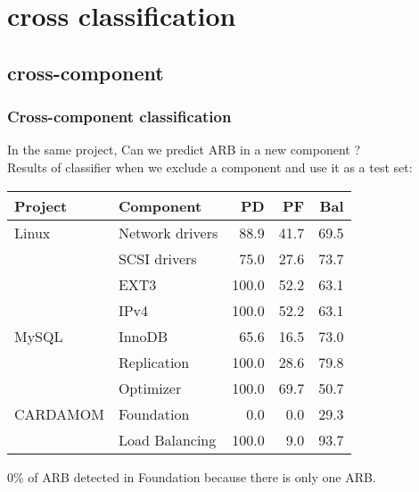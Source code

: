 \section{cross classification}

\subsection{cross-component}
\begin{frame}
 \frametitle{Cross-component classification}
 \alert{In the same project, Can we predict ARB in a new component ?}\\
 Results of classifier when we exclude a component and use it as a test set:
 \begin{center}
  \begin{tabular}{l l|r r r}
   Project & Component & PD & PF & Bal\\
   \hline
   Linux & Network drivers & 88.9 & 41.7 & 69.5\\
    & SCSI drivers & 75.0 & 27.6 & 73.7\\
    & EXT3 & 100.0 & 52.2 & 63.1\\
    & IPv4 & 100.0 & 52.2 & 63.1\\
   \hline
   MySQL & InnoDB & 65.6 & 16.5 & 73.0\\
    & Replication & 100.0 & 28.6 & 79.8\\
    & Optimizer & 100.0 & 69.7 & 50.7\\
   \hline
   CARDAMOM & Foundation & 0.0 & 0.0 & 29.3\\
    & Load Balancing & 100.0 & 9.0 & 93.7\\
   \hline
  \end{tabular}
 \end{center}
 \small 0\% of ARB detected in Foundation because there is only one ARB. \normalsize
\end{frame}

